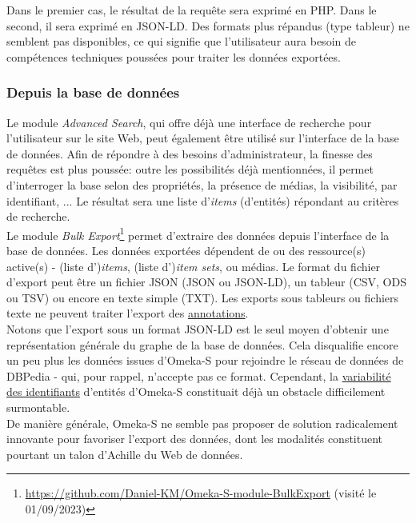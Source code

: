 \documentclass[a4paper,12pt,twoside]{book}
\begin{document}
Dans le premier cas, le résultat de la requête sera exprimé en PHP. Dans le second, il sera exprimé en JSON-LD. Des formats plus répandus (type tableur) ne semblent pas disponibles, ce qui signifie que l'utilisateur aura besoin de compétences techniques poussées pour traiter les données exportées. 

\subsubsection{Depuis la base de données}\label{3-exportsOS}
Le module \textit{Advanced Search}, qui offre déjà une interface de recherche pour l'utilisateur sur le site Web, peut également être utilisé sur l'interface de la base de données. Afin de répondre à des besoins d'administrateur, la finesse des requêtes est plus poussée: outre les possibilités déjà mentionnées, il permet d'interroger la base selon des propriétés, la présence de médias, la visibilité, par identifiant, ... Le résultat sera une liste d'\textit{items} (d'entités) répondant au critères de recherche.\\

Le module \textit{Bulk Export}\footnote{\url{https://github.com/Daniel-KM/Omeka-S-module-BulkExport} (visité le 01/09/2023)} permet d'extraire des données depuis l'interface de la base de données. Les données exportées dépendent de ou des ressource(s) active(s) - (liste d')\textit{items}, (liste d')\textit{item sets}, ou médias. Le format du fichier d'export peut être un fichier JSON (JSON ou JSON-LD), un tableur (CSV, ODS ou TSV) ou encore en texte simple (TXT). Les exports sous tableurs ou fichiers texte ne peuvent traiter l'export des \hyperref[3-reification]{annotations}.\\

Notons que l'export sous un format JSON-LD est le seul moyen d'obtenir une représentation générale du graphe de la base de données. Cela disqualifie encore un peu plus les données issues d'Omeka-S pour rejoindre le réseau de données de DBPedia - qui, pour rappel, n'accepte pas ce format. Cependant, la \hyperref[omeka-dans-wdd]{variabilité des identifiants} d'entités d'Omeka-S constituait déjà un obstacle difficilement surmontable.\\

De manière générale, Omeka-S ne semble pas proposer de solution radicalement innovante pour favoriser l'export des données, dont les modalités constituent pourtant un talon d'Achille du Web de données.
       
	
	
\end{document}
